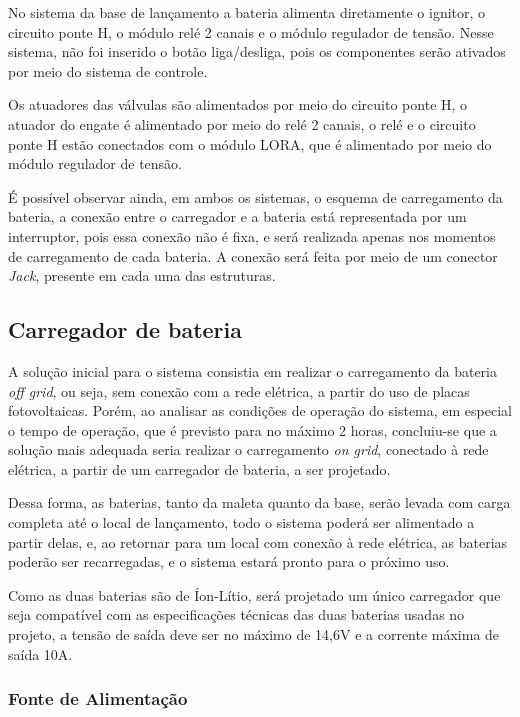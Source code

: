No sistema da base de lançamento a bateria alimenta diretamente o ignitor, o circuito ponte H, o módulo relé 2 canais e o módulo regulador de tensão. Nesse sistema, não foi inserido o botão liga/desliga, pois os componentes serão ativados por meio do sistema de controle.

Os atuadores das válvulas são alimentados por meio do circuito ponte H, o atuador do engate é alimentado por meio do relé 2 canais, o relé e o circuito ponte H estão conectados com o módulo LORA, que é alimentado por meio do módulo regulador de tensão.

É possível observar ainda, em ambos os sistemas, o esquema de carregamento da bateria, a conexão entre o carregador e a bateria está representada por um interruptor, pois essa conexão não é fixa, e será realizada apenas nos momentos de carregamento de cada bateria. A conexão será feita por meio de um conector \textit{Jack}, presente em cada uma das estruturas.

\subsection{Carregador de bateria}

A solução inicial para o sistema consistia em realizar o carregamento da bateria \textit{off grid}, ou seja, sem conexão com a rede elétrica, a partir do uso de placas fotovoltaicas. Porém, ao analisar as condições de operação do sistema, em especial o tempo de operação, que é previsto para no máximo 2 horas, concluiu-se que a solução mais adequada seria realizar o carregamento \textit{on grid}, conectado à rede elétrica, a partir de um carregador de bateria, a ser projetado.

Dessa forma, as baterias, tanto da maleta quanto da base, serão levada com carga completa até o local de lançamento, todo o sistema poderá ser alimentado a partir delas, e, ao retornar para um local com conexão à rede elétrica, as baterias poderão ser recarregadas, e o sistema estará pronto para o próximo uso.

Como as duas baterias são de Íon-Lítio, será projetado um único carregador que seja compatível com as especificações técnicas das duas baterias usadas no projeto, a tensão de saída deve ser no máximo de 14,6V e a corrente máxima de saída 10A.

\subsubsection{Fonte de Alimentação}

